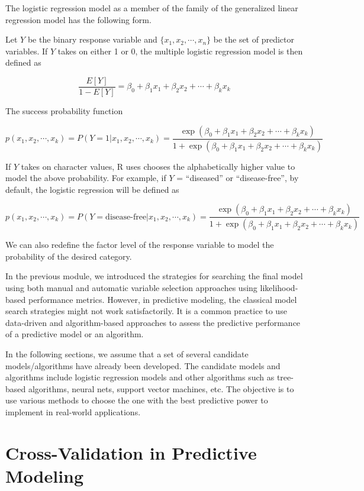 \documentclass[
]{book}
\begin{document}
The logistic regression model as a member of the family of the generalized linear regression model has the following form.

Let \(Y\) be the binary response variable and \(\{x_1, x_2, \cdots, x_n \}\) be the set of predictor variables. If \(Y\) takes on either 1 or 0, the multiple logistic regression model is then defined as

\[
\frac{E[Y]}{1-E[Y]} = \beta_0 + \beta_1x_1 + \beta_2 x_2 + \cdots + \beta_kx_k
\]

The success probability function

\[
p(x_1, x_2, \cdots, x_k)=P(Y=1|x_1, x_2, \cdots, x_k) =\frac{\exp(\beta_0 + \beta_1x_1 + \beta_2 x_2 + \cdots + \beta_kx_k)}{1+\exp(\beta_0 + \beta_1x_1 + \beta_2 x_2 + \cdots + \beta_kx_k)}
\]

If \(Y\) takes on character values, R uses chooses the alphabetically higher value to model the above probability. For example, if \(Y\) = ``diseased'' or ``disease-free'', by default, the logistic regression will be defined as

\[
p(x_1, x_2, \cdots, x_k)=P(Y= \text{disease-free}|x_1, x_2, \cdots, x_k) =\frac{\exp(\beta_0 + \beta_1x_1 + \beta_2 x_2 + \cdots + \beta_kx_k)}{1+\exp(\beta_0 + \beta_1x_1 + \beta_2 x_2 + \cdots + \beta_kx_k)}
\]

We can also redefine the factor level of the response variable to model the probability of the desired category.

In the previous module, we introduced the strategies for searching the final model using both manual and automatic variable selection approaches using likelihood-based performance metrics. However, in predictive modeling, the classical model search strategies might not work satisfactorily. It is a common practice to use data-driven and algorithm-based approaches to assess the predictive performance of a predictive model or an algorithm.

In the following sections, we assume that a set of several candidate models/algorithms have already been developed. The candidate models and algorithms include logistic regression models and other algorithms such as tree-based algorithms, neural nets, support vector machines, etc. The objective is to use various methods to choose the one with the best predictive power to implement in real-world applications.

\hypertarget{cross-validation-in-predictive-modeling}{%
\section{Cross-Validation in Predictive Modeling}\label{cross-validation-in-predictive-modeling}}
\end{document}

